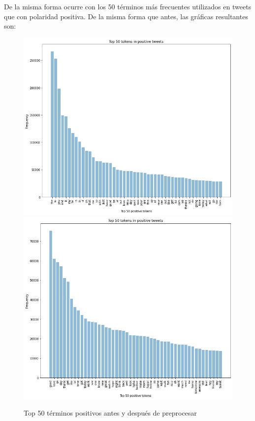 \documentclass[a4paper,12pt]{report}
\begin{document}
\clearpage

{\setlength{\parindent}{0cm}
De la misma forma ocurre con los 50 términos más frecuentes utilizados en tweets que con polaridad positiva. De la misma forma que antes, las gráficas resultantes son:}

\begin{figure}[htbp!]
\begin{center}
\includegraphics[scale=0.3]{images/pos.png}
\includegraphics[scale=0.3]{images/pos_clean.png}
\end{center}
\caption{Top 50 términos positivos antes y después de preprocesar}
\end{figure}
\end{document}
